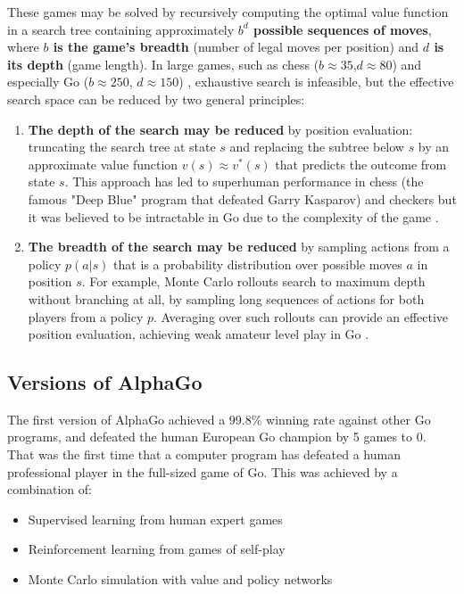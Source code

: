 \documentclass{article}
\begin{document}
These games may be solved by recursively computing the optimal value function in a search tree
containing approximately \textbf{$b^d$ possible sequences of moves}, where \textbf{$b$ is the game's breadth} (number of legal moves per position) and \textbf{$d$ is its depth} (game length). In large games, such as chess ($b \approx 35$,$ d \approx 80$) \cite{Allis1994SearchingFS} and especially Go ($b \approx 250$, $d \approx 150$) \cite{Allis1994SearchingFS}, exhaustive search is infeasible, but the effective search space can be reduced by two general principles:
\begin{enumerate}
	\item \textbf{The depth of the search may be reduced} by position evaluation: truncating the search tree at state $s$ and replacing the subtree below $s$ by an approximate value function $v(s) \approx v^*(s)$ that predicts the outcome from state $s$. This approach has led to superhuman performance in chess \cite{CAMPBELL200257} (the famous "Deep Blue" program that defeated Garry Kasparov\cite{CAMPBELL200257}) and checkers \cite{10.1007/3-540-48957-6_8} but it was believed to be intractable in Go due to the complexity of the game \cite{MULLER2002145}.
	\item \textbf{The breadth of the search may be reduced} by sampling actions from a policy $p(a|s)$ that is a probability distribution over possible moves $a$ in position $s$. For example,
	Monte Carlo rollouts search to maximum depth without branching at all, by sampling long sequences of actions for both players from a
	policy $p$. Averaging over such rollouts can provide an effective position evaluation, achieving weak amateur level play in Go \cite{Bouzy2004}.
	
	
\end{enumerate}

\subsection{Versions  of AlphaGo}
The first version of AlphaGo \cite{Silver_2016} achieved a 99.8\% winning rate against other Go programs, and defeated the human European Go champion by 5 games to 0. That was the first time that a computer program has defeated a human professional player in the full-sized game of Go. This was achieved by a combination of:
\begin{itemize}
	\item Supervised learning from human expert games
	\item Reinforcement learning from games of self-play
	\item Monte Carlo simulation with value and policy networks
\end{itemize}
\end{document}
